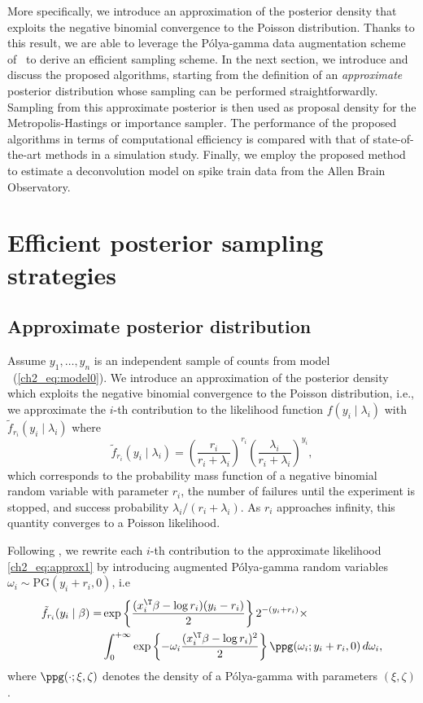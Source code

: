 More specifically, we introduce an approximation of the posterior density that exploits the negative binomial convergence to the Poisson distribution. Thanks to this result, we are able to leverage the P\'olya-gamma data augmentation scheme of~\textcite{polson_scott_2013} to derive an efficient sampling scheme. 
In the next section, we introduce and discuss the proposed algorithms, starting from the definition of an \emph{approximate} posterior distribution whose sampling can be performed straightforwardly.
Sampling from this approximate posterior is then used as proposal density for the Metropolis-Hastings or importance sampler. The performance of the proposed algorithms in terms of computational efficiency is compared with that of state-of-the-art methods in a simulation study. Finally, we employ the proposed method to estimate a deconvolution model on spike train data from the Allen Brain Observatory.


\vfill

\section{Efficient posterior sampling strategies}
\label{ch2_sec:2}

\subsection{Approximate posterior distribution}\label{ch2_sec:approx_distr}

Assume $y_1,\dots,y_n$ is an independent sample of counts from model ~(\ref{ch2_eq:model0}). 
We introduce an approximation of the posterior density which exploits the negative binomial convergence to the Poisson distribution, i.e., we approximate the $i$-th contribution to the likelihood function $f(y_i \mid \lambda_i)$ with $\tilde{f}_{r_i}(y_i \mid \lambda_i)$ where 
\begin{equation}
\tilde{f}_{r_i}(y_i \mid \lambda_i) = \left( \frac{r_i}{r_i + \lambda_i}\right)^{r_i} \left(\frac{\lambda_i}{r_i+ \lambda_i}\right)^{y_i},
\label{ch2_eq:approx1}
\end{equation}
which corresponds to the probability mass function of a negative binomial random variable with parameter $r_i$, the number of failures until the experiment is stopped, and success probability $\lambda_i/(r_i+\lambda_i)$. As $r_i$ approaches infinity, this quantity converges to a Poisson likelihood.

Following \textcite{polson_scott_2013}, we rewrite each $i$-th contribution to the approximate likelihood \eqref{ch2_eq:approx1} by introducing augmented P\'olya-gamma random variables $\omega_i \sim \mbox{PG}(y_i+r_i,0)$, i.e
\begin{align*}
\tilde{f}_{r_i}(y_i \mid \beta) = & \exp\left\{ \frac{(x_i^\T \beta - \log r_i)(y_i-r_i)}{2} \right\} 2^{-(y_i+r_i)} \times \\ 
& \int_{0}^{+\infty} \exp\left\{-\omega_i\frac{(x_i^\T \beta - \log r_i)^2}{2} \right\} \ppg(\omega_i; y_i + r_i,0) \, d\omega_i,   
\end{align*}
where $\ppg(\cdot; \xi,\zeta)$ denotes the density of a P\'olya-gamma with parameters $( \xi,\zeta)$. 
%

